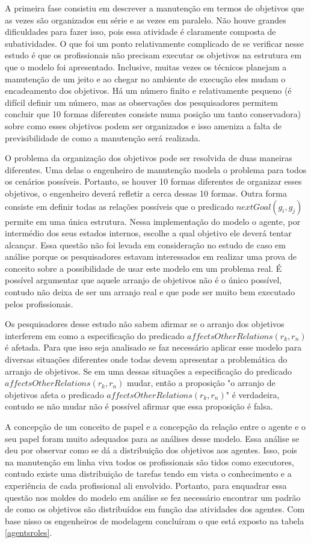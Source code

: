 A primeira fase consistiu em descrever a manutenção em termos de objetivos que as vezes são organizados em série e as vezes em paralelo. Não houve grandes dificuldades para fazer isso, pois essa atividade é claramente composta de subatividades. O que foi um ponto relativamente complicado de se verificar nesse estudo é que os profissionais não precisam executar os objetivos na estrutura em que o modelo foi apresentado. Inclusive, muitas vezes os técnicos planejam a manutenção de um jeito e ao chegar no ambiente de execução eles mudam o encadeamento dos objetivos. Há um número finito e relativamente pequeno (é difícil definir um número, mas as observações dos pesquisadores permitem concluir que 10 formas diferentes consiste numa posição um tanto conservadora) sobre como esses objetivos podem ser organizados e isso ameniza a falta de previsibilidade de como a manutenção será realizada. 

O problema da organização dos objetivos pode ser resolvida de duas maneiras diferentes. Uma delas o engenheiro de manutenção modela o problema para todos os cenários possíveis. Portanto, 
se houver 10 formas diferentes de organizar esses objetivos, o engenheiro deverá refletir a cerca dessas 10 formas. Outra forma consiste em definir todas as relações possíveis que o predicado 
$nextGoal(g_i,g_j)$ permite em uma única estrutura. Nessa implementação do modelo o agente, por intermédio dos seus estados internos, escolhe a qual objetivo ele deverá tentar alcançar. Essa 
questão não foi levada em consideração no estudo de caso em análise porque os pesquisadores estavam interessados em realizar uma prova de conceito sobre a possibilidade de usar este modelo 
em um problema real. É possível argumentar que aquele arranjo de objetivos não é o único possível, contudo não deixa de ser um arranjo real e que pode ser muito bem executado pelos profissionais. 

Os pesquisadores desse estudo não sabem afirmar se o arranjo dos objetivos interferem em como a especificação do predicado $affectsOtherRelations(r_k,r_n)$ é afetada. Para que isso seja analisado se faz necessário aplicar esse modelo para diversas situações diferentes onde todas devem apresentar a problemática do arranjo de objetivos. Se em uma dessas situações a especificação do predicado $affectsOtherRelations(r_k,r_n)$ mudar, então a proposição "o arranjo de objetivos afeta o predicado $affectsOtherRelations(r_k,r_n)$" é verdadeira, contudo se não mudar não é possível afirmar que essa proposição é falsa. 

A concepção de um conceito de papel e a concepção da relação entre o agente e o seu papel foram muito adequados para as análises desse modelo. Essa análise se deu por observar como se dá 
a distribuição dos objetivos aos agentes. Isso, pois na manutenção em linha viva todos os profissionais são tidos como executores, contudo existe uma distribuição de tarefas tendo em vista 
o conhecimento e a experiência de cada profissional ali envolvido. Portanto, para enquadrar essa questão nos moldes do modelo em análise se fez necessário encontrar um padrão de como os objetivos 
são distribuídos em função das atividades dos agentes. Com base nisso os engenheiros de modelagem concluíram o que está exposto na tabela \ref{agentsroles}.

